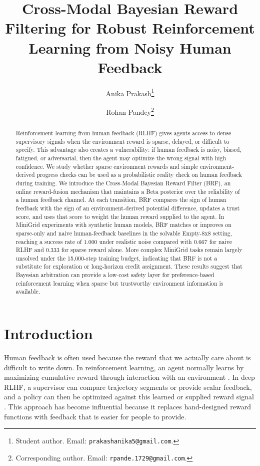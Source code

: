 \documentclass[11pt]{article}
\title{Cross-Modal Bayesian Reward Filtering for Robust Reinforcement Learning from Noisy Human Feedback}
\author{
Anika Prakash\thanks{Student author. Email: \texttt{prakashanika5@gmail.com}.}
\and
Rohan Pandey\thanks{Corresponding author. Email: \texttt{rpande.1729@gmail.com}.}
}
\date{}
\begin{document}
\maketitle

\begin{abstract}
Reinforcement learning from human feedback (RLHF) gives agents access to dense supervisory signals when the environment reward is sparse, delayed, or difficult to specify. This advantage also creates a vulnerability: if human feedback is noisy, biased, fatigued, or adversarial, then the agent may optimize the wrong signal with high confidence. We study whether sparse environment rewards and simple environment-derived progress checks can be used as a probabilistic reality check on human feedback during training. We introduce the Cross-Modal Bayesian Reward Filter (BRF), an online reward-fusion mechanism that maintains a Beta posterior over the reliability of a human feedback channel. At each transition, BRF compares the sign of human feedback with the sign of an environment-derived potential difference, updates a trust score, and uses that score to weight the human reward supplied to the agent. In MiniGrid experiments with synthetic human models, BRF matches or improves on sparse-only and naive human-feedback baselines in the solvable Empty-8x8 setting, reaching a success rate of $1.000$ under realistic noise compared with $0.667$ for naive RLHF and $0.333$ for sparse reward alone. More complex MiniGrid tasks remain largely unsolved under the 15,000-step training budget, indicating that BRF is not a substitute for exploration or long-horizon credit assignment. These results suggest that Bayesian arbitration can provide a low-cost safety layer for preference-based reinforcement learning when sparse but trustworthy environment information is available.
\end{abstract}

\section{Introduction}

Human feedback is often used because the reward that we actually care about is difficult to write down. In reinforcement learning, an agent normally learns by maximizing cumulative reward through interaction with an environment \cite{sutton2018reinforcement}. In deep RLHF, a supervisor can compare trajectory segments or provide scalar feedback, and a policy can then be optimized against this learned or supplied reward signal \cite{christiano2017deep,warnell2018deep}. This approach has become influential because it replaces hand-designed reward functions with feedback that is easier for people to provide.
\end{document}
